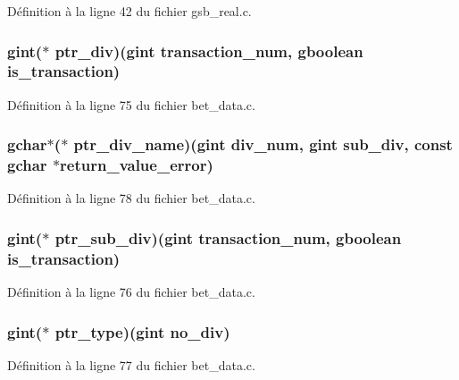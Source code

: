 Définition à la ligne 42 du fichier gsb\_\-real.c.

\subsubsection[{ptr\_\-div}]{\setlength{\rightskip}{0pt plus 5cm}gint($\ast$ {\bf ptr\_\-div})(gint transaction\_\-num, gboolean is\_\-transaction)}\label{bet__data_8c_a30c03a279ce8440557b96c66cee7dfeb}


Définition à la ligne 75 du fichier bet\_\-data.c.

\subsubsection[{ptr\_\-div\_\-name}]{\setlength{\rightskip}{0pt plus 5cm}gchar$\ast$($\ast$ {\bf ptr\_\-div\_\-name})(gint div\_\-num, gint sub\_\-div, const gchar $\ast$return\_\-value\_\-error)}\label{bet__data_8c_a077bff3a3e81222d14f90c23c886e99c}


Définition à la ligne 78 du fichier bet\_\-data.c.

\subsubsection[{ptr\_\-sub\_\-div}]{\setlength{\rightskip}{0pt plus 5cm}gint($\ast$ {\bf ptr\_\-sub\_\-div})(gint transaction\_\-num, gboolean is\_\-transaction)}\label{bet__data_8c_aef277c7a40bd87dddd1debe83ce337bf}


Définition à la ligne 76 du fichier bet\_\-data.c.

\subsubsection[{ptr\_\-type}]{\setlength{\rightskip}{0pt plus 5cm}gint($\ast$ {\bf ptr\_\-type})(gint no\_\-div)}\label{bet__data_8c_a932f6d02883ab21b24a201e03911aaf2}


Définition à la ligne 77 du fichier bet\_\-data.c.

